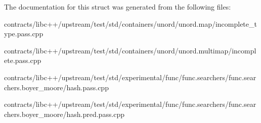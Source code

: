The documentation for this struct was generated from the following files\+:\begin{DoxyCompactItemize}
\item 
contracts/libc++/upstream/test/std/containers/unord/unord.\+map/incomplete\+\_\+type.\+pass.\+cpp\item 
contracts/libc++/upstream/test/std/containers/unord/unord.\+multimap/incomplete.\+pass.\+cpp\item 
contracts/libc++/upstream/test/std/experimental/func/func.\+searchers/func.\+searchers.\+boyer\+\_\+moore/hash.\+pass.\+cpp\item 
contracts/libc++/upstream/test/std/experimental/func/func.\+searchers/func.\+searchers.\+boyer\+\_\+moore/hash.\+pred.\+pass.\+cpp\end{DoxyCompactItemize}
